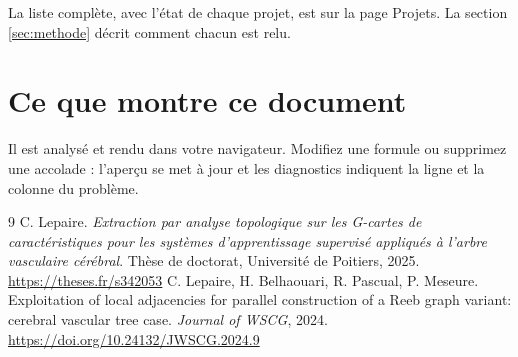 \documentclass{article}
\begin{document}
\noindent La liste complète, avec l'état de chaque projet, est sur la page Projets. La section
\ref{sec:methode} décrit comment chacun est relu.

\section{Ce que montre ce document}
Il est analysé et rendu dans votre navigateur. Modifiez une formule ou supprimez une accolade :
l'aperçu se met à jour et les diagnostics indiquent la ligne et la colonne du problème.

\begin{thebibliography}{9}
 C. Lepaire. \emph{Extraction par analyse topologique sur les G-cartes de
caractéristiques pour les systèmes d'apprentissage supervisé appliqués à l'arbre vasculaire
cérébral}. Thèse de doctorat, Université de Poitiers, 2025.
\url{https://theses.fr/s342053}
 C. Lepaire, H. Belhaouari, R. Pascual, P. Meseure. Exploitation of local adjacencies
for parallel construction of a Reeb graph variant: cerebral vascular tree case. \emph{Journal of
WSCG}, 2024. \url{https://doi.org/10.24132/JWSCG.2024.9}
\end{thebibliography}
\end{document}
